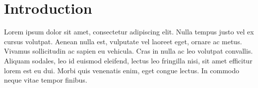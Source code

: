 \section{Introduction}

 Lorem ipsum dolor sit amet, consectetur adipiscing elit. Nulla tempus justo vel ex cursus volutpat. Aenean nulla est, vulputate vel laoreet eget, ornare ac metus. Vivamus sollicitudin ac sapien eu vehicula. Cras in nulla ac leo volutpat convallis. Aliquam sodales, leo id euismod eleifend, lectus leo fringilla nisi, sit amet efficitur lorem est eu dui. Morbi quis venenatis enim, eget congue lectus. In commodo neque vitae tempor finibus.
 
\clearpage
